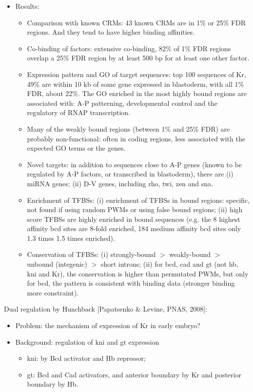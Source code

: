 \documentclass{report}
\begin{document}
\begin{enumerate}
\begin{itemize}
		\item Results: 
		\begin{itemize}
			\item Comparison with known CRMs: 43 known CRMs are in 1\% or 25\% FDR regions. And they tend to have higher binding affinities. 
			\item Co-binding of factors: extensive co-binding, 82\% of 1\% FDR regions overlap a 25\% FDR region by at least 500 bp for at least one other factor.
			\item Expression pattern and GO of target sequences: top 100 sequences of Kr, 49\% are within 10 kb of some gene expressed in blastoderm, with all 1\% FDR, about 22\%. The GO enriched in the most highly bound regions are associated with: A-P patterning, developmental control and the regulatory of RNAP transcription. 
			\item Many of the weakly bound regions (between 1\% and 25\% FDR) are probably non-functional: often in coding regions, less associated with the expected GO terms or the genes. 
			\item Novel targets: in addition to sequences close to A-P genes (known to be regulated by A-P factors, or transcribed in blastoderm), there are (i) miRNA genes; (ii) D-V genes, including rho, twi, zen and sna. 
			\item Enrichment of TFBSs: (i) enrichment of TFBSs in bound regions: specific, not found if using random PWMs or using false bound regions; (ii) high score TFBSs are highly enriched in bound sequences (e.g. the 8 highest affinity bcd sites are 8-fold enriched, 184 medium affinity bcd sites only 1.3 times 1.5 times enriched). 
			\item Conservation of TFBSs: (i) strongly-bound $>$ weakly-bound $>$ unbound (integenic) $>$ short introns; (ii) for bcd, cad and gt (not hb, kni and Kr), the conservation is higher than permutated PWMs, but only for bcd, the pattern is consistent with binding data (stronger binding more constraint). 
		\end{itemize}
	\end{itemize}
	
	Dual regulation by Hunchback [Papatsenko \& Levine, PNAS, 2008]:
	\begin{itemize}
		\item Problem: the mechanism of expression of Kr in early embryo? 
		
		\item Background: regulation of kni and gt expression
		\begin{itemize}
			\item kni: by Bcd activator and Hb repressor; 
			\item gt: Bcd and Cad activators, and anterior boundary by Kr and posterior boundary by Hb. 
		\end{itemize}
		

\end{itemize}
\end{enumerate}
\end{document}
